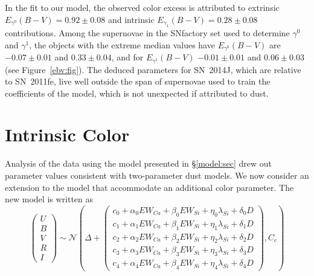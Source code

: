 \documentclass{aastex61}   	%
\begin{document}
In the fit to our model, the observed color excess is attributed to   extrinsic
$E_{\gamma^0}(B-V)=  0.92 \pm   0.08$ and intrinsic $E_{\gamma_1}(B-V)=  0.28 \pm   0.08$
contributions.
Among the supernovae in the SNfactory  set used to determine $\gamma^0$ and $\gamma^1$, the
\color{red}
objects with the extreme median values have 
$E_{\gamma^0}(B-V)$ are $-0.07 \pm 0.01$ and  $  0.33 \pm 0.04$,
and for $E_{\gamma^1}(B-V)$ $-0.01 \pm 0.01$  and
$  0.06 \pm 0.03$ 
(see Figure~\ref{ebv:fig}).
The deduced parameters for SN~2014J, which are relative to SN~2011fe, live well outside the 
span of supernovae used to train the coefficients of the model, which is not unexpected if
attributed to dust.



\section{Intrinsic Color}
\label{model2:sec}
Analysis of the data using the model presented in \S\ref{model:sec} drew out parameter values consistent
with two-parameter dust models.  We now consider an extension to the model that accommodate an additional
color parameter.
The new model is written as
\begin{equation}
\begin{pmatrix}
U\\B\\V\\R\\I
\end{pmatrix}
\sim \mathcal{N}
\left(
\Delta +
\begin{pmatrix}
c_0+\alpha_0 EW_{Ca} + \beta_0 EW_{Si} + \eta_0 \lambda_{Si} + \delta_0 D\\
c_1+\alpha_1 EW_{Ca} + \beta_1 EW_{Si} + \eta_1 \lambda_{Si} + \delta_1 D \\
c_2+\alpha_2 EW_{Ca} + \beta_2 EW_{Si} + \eta_2 \lambda_{Si} + \delta_2 D\\
c_3+\alpha_3 EW_{Ca} + \beta_3 EW_{Si} + \eta_3 \lambda_{Si} + \delta_3 D\\
c_4+\alpha_4 EW_{Ca} + \beta_4 EW_{Si}+ \eta_4 \lambda_{Si} + \delta_4 D
\end{pmatrix}
,C_{c}
\right)
\label{ewsiv:eqn}
\end{equation}
\end{document}
